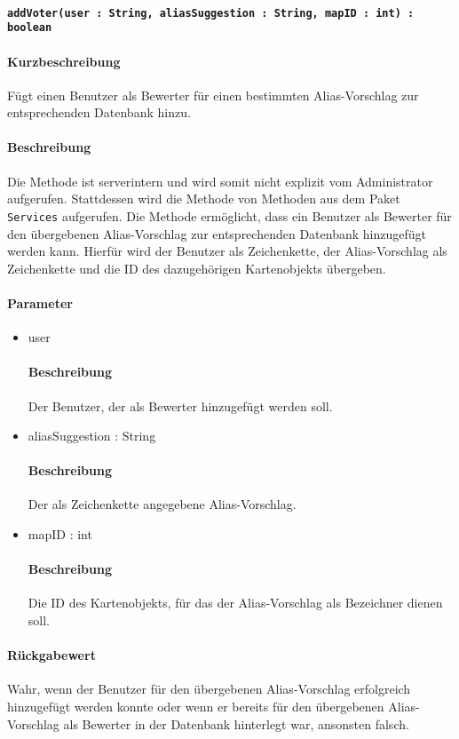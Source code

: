 \paragraph{\texttt{addVoter(user : String, aliasSuggestion : String, mapID : int) : boolean}}%
\paragraph*{Kurzbeschreibung}
Fügt einen Benutzer als Bewerter für einen bestimmten Alias-Vorschlag zur entsprechenden Datenbank hinzu.
\paragraph*{Beschreibung}
Die Methode ist serverintern und wird somit nicht explizit vom Administrator aufgerufen.
Stattdessen wird die Methode von Methoden aus dem Paket \texttt{Services} aufgerufen.
Die Methode ermöglicht, dass ein Benutzer als Bewerter für den übergebenen Alias-Vorschlag zur entsprechenden Datenbank hinzugefügt werden kann.
Hierfür wird der Benutzer als Zeichenkette, der Alias-Vorschlag als Zeichenkette und die ID des dazugehörigen Kartenobjekts übergeben.
\paragraph*{Parameter}
\begin{itemize}
	\item user
		\paragraph*{Beschreibung}
		Der Benutzer, der als Bewerter hinzugefügt werden soll.
    \item aliasSuggestion : String
    		\paragraph*{Beschreibung}
    		Der als Zeichenkette angegebene Alias-Vorschlag.
    	\item mapID : int
    		\paragraph*{Beschreibung}
    		Die ID des Kartenobjekts, für das der Alias-Vorschlag als Bezeichner dienen soll.
\end{itemize}
\paragraph*{Rückgabewert}
Wahr, wenn der Benutzer für den übergebenen Alias-Vorschlag erfolgreich hinzugefügt werden konnte oder wenn er bereits für den übergebenen Alias-Vorschlag als Bewerter in der Datenbank hinterlegt war, ansonsten falsch.
